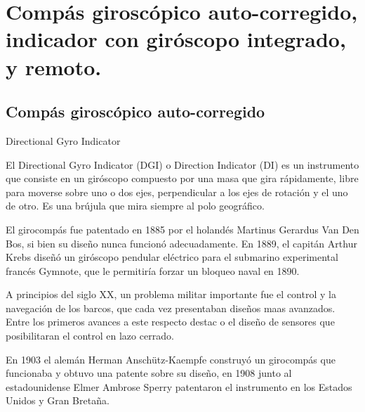 
\section{Comp\'as girosc\'opico auto-corregido, indicador con gir\'oscopo integrado, y remoto.}
\label{sec:compas.giroscopico.autocorregido}

\subsection{Comp\'as girosc\'opico auto-corregido}
\label{sec:compas.giroscopico.autocorregido}

\begin{frame}{Directional Gyro Indicator}

El Directional Gyro Indicator (DGI) o Direction Indicator (DI) es un
instrumento que consiste en un gir\'oscopo compuesto por una masa que
gira r\'apidamente, libre para moverse sobre uno o dos ejes, perpendicular
a los ejes de rotaci\'on y el uno de otro. Es una br\'ujula que mira siempre al
polo geogr\'afico.

El girocompás fue patentado en 1885 por el holand\'es Martinus Gerardus Van Den Bos, 
si bien su dise\~no nunca funcion\'o adecuadamente. En 1889, el capit\'an Arthur Krebs 
dise\~n\'o un gir\'oscopo pendular el\'ectrico para el submarino experimental franc\'es Gymnote, 
que le permitir\'ia forzar un bloqueo naval en 1890. 

A principios del siglo XX, un problema militar importante fue el control y
la navegaci\'on de los barcos, que cada vez presentaban dise\~nos maas
avanzados. Entre los primeros avances a este respecto destac o el dise\~no
de sensores que posibilitaran el control en lazo cerrado.

En 1903 el alem\'an Herman Ansch\"utz-Kaempfe construy\'o un girocomp\'as
que funcionaba y obtuvo una patente sobre su dise\~no, en 1908 junto al estadounidense 
Elmer Ambrose Sperry patentaron el
instrumento en los Estados Unidos y Gran Breta\~na.

\end{frame}


